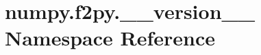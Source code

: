 \hypertarget{namespacenumpy_1_1f2py_1_1____version____}{}\section{numpy.\+f2py.\+\_\+\+\_\+version\+\_\+\+\_\+ Namespace Reference}
\label{namespacenumpy_1_1f2py_1_1____version____}
